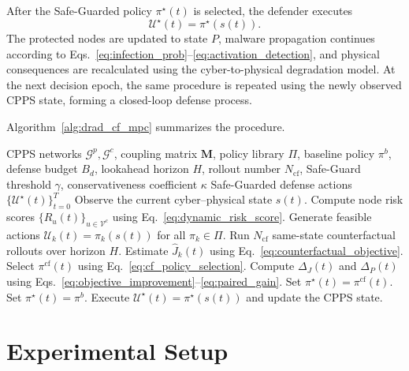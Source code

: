 \documentclass[lettersize,journal]{IEEEtran}
\begin{document}
After the Safe-Guarded policy $\pi^{\star}(t)$ is selected, the defender executes
\begin{equation}
    \mathcal{U}^{\star}(t)
    =
    \pi^{\star}(s(t)).
    \label{eq:final_action}
\end{equation}
The protected nodes are updated to state $P$, malware propagation continues according to Eqs.~\eqref{eq:infection_prob}--\eqref{eq:activation_detection}, and physical consequences are recalculated using the cyber-to-physical degradation model. At the next decision epoch, the same procedure is repeated using the newly observed CPPS state, forming a closed-loop defense process.

Algorithm~\ref{alg:drad_cf_mpc} summarizes the procedure.

\begin{algorithm}[t]
\caption{DRAD-CF-MPC for malware-resilient CPPS defense}
\label{alg:drad_cf_mpc}
\begin{algorithmic}[1]
\REQUIRE CPPS networks $\mathcal{G}^{p},\mathcal{G}^{c}$, coupling matrix $\mathbf{M}$, policy library $\Pi$, baseline policy $\pi^{b}$, defense budget $B_d$, lookahead horizon $H$, rollout number $N_{\mathrm{cf}}$, Safe-Guard threshold $\gamma$, conservativeness coefficient $\kappa$
\ENSURE Safe-Guarded defense actions $\{\mathcal{U}^{\star}(t)\}_{t=0}^{T}$
    \STATE Observe the current cyber--physical state $s(t)$.
    \STATE Compute node risk scores $\{R_u(t)\}_{u\in\mathcal{V}^{c}}$ using Eq.~\eqref{eq:dynamic_risk_score}.
    \STATE Generate feasible actions $\mathcal{U}_{k}(t)=\pi_k(s(t))$ for all $\pi_k\in\Pi$.
        \STATE Run $N_{\mathrm{cf}}$ same-state counterfactual rollouts over horizon $H$.
        \STATE Estimate $\widehat{J}_{k}(t)$ using Eq.~\eqref{eq:counterfactual_objective}.
    \ENDFOR
    \STATE Select $\pi^{\mathrm{cf}}(t)$ using Eq.~\eqref{eq:cf_policy_selection}.
    \STATE Compute $\Delta_J(t)$ and $\Delta_P(t)$ using Eqs.~\eqref{eq:objective_improvement}--\eqref{eq:paired_gain}.
        \STATE Set $\pi^{\star}(t)=\pi^{\mathrm{cf}}(t)$.
    \ELSE
        \STATE Set $\pi^{\star}(t)=\pi^{b}$.
    \ENDIF
    \STATE Execute $\mathcal{U}^{\star}(t)=\pi^{\star}(s(t))$ and update the CPPS state.
\ENDFOR
\end{algorithmic}
\end{algorithm}



\section{Experimental Setup}
\label{sec:experimental_setup}
\end{document}
